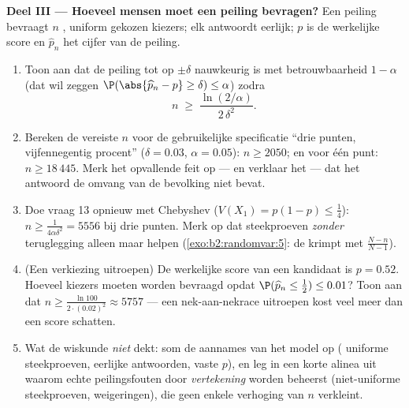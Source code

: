 \begin{problem}
\medskip
\noindent\textbf{Deel III --- Hoeveel mensen moet een peiling
bevragen?} Een peiling bevraagt $n$ , uniform gekozen
kiezers; elk antwoordt eerlijk; $p$ is de werkelijke score en
$\widehat p_n$ het cijfer van de peiling.
\begin{enumerate}[resume]
  \item Toon aan dat de peiling tot op $\pm\delta$ nauwkeurig is
        met betrouwbaarheid $1 - \alpha$ (dat wil zeggen
        $\P(\abs{\widehat p_n - p} \geq \delta) \leq \alpha$) zodra
        \[
        n \;\geq\; \frac{\ln(2/\alpha)}{2\,\delta^2} .
        \]
  \item Bereken de vereiste $n$ voor de gebruikelijke specificatie
        ``drie punten, vijfennegentig procent'' ($\delta = 0.03$,
        $\alpha = 0.05$): $n \geq 2050$; en voor één punt: $n \geq
        18\,445$. Merk het opvallende feit op --- en verklaar het
        --- dat het antwoord de omvang van de bevolking niet
        bevat.
  \item Doe vraag 13 opnieuw met Chebyshev ($V(X_1) = p(1-p) \leq
        \frac14$): $n \geq \frac1{4\alpha\delta^2} = 5556$ bij drie
        punten. Merk op dat steekproeven \emph{zonder} teruglegging
        alleen maar helpen (\cref{exo:b2:randomvar:5}: de 
        krimpt met $\frac{N-n}{N-1}$).
  \item (Een verkiezing uitroepen) De werkelijke score van een
        kandidaat is $p = 0.52$. Hoeveel kiezers moeten worden
        bevraagd opdat $\P(\widehat p_n \leq \tfrac12) \leq 0.01$?
        Toon aan dat $n \geq \frac{\ln 100}{2\cdot(0.02)^2} \approx
        5757$ --- een nek-aan-nekrace uitroepen kost veel meer dan
        een score schatten.
  \item Wat de wiskunde \emph{niet} dekt: som de aannames van het
        model op ( uniforme steekproeven, eerlijke
        antwoorden, vaste $p$), en leg in een korte alinea uit
        waarom echte peilingsfouten door \emph{vertekening} worden
        beheerst (niet-uniforme steekproeven, weigeringen), die
        geen enkele verhoging van $n$ verkleint.
\end{enumerate}


\end{problem}
